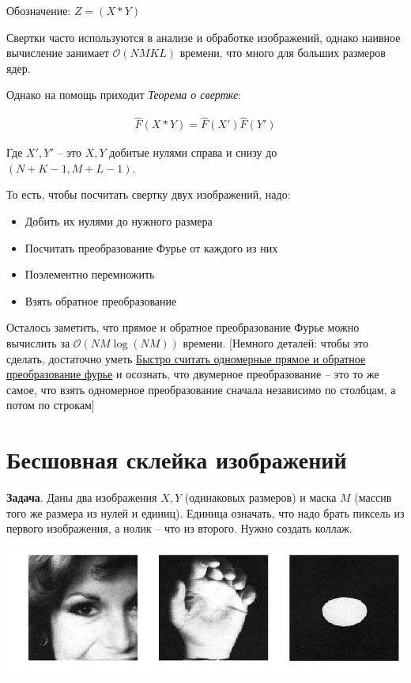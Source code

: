 \documentclass[]{book}
\theoremstyle{definition}
\begin{document}
    Обозначение: $Z = (X \ast Y)$
    
    Свертки часто используются в анализе и обработке изображений, однако наивное вычисление занимает $\mathcal{O}(NMKL)$ времени, что много для больших размеров ядер.
    
    Однако на помощь приходит \textit{Теорема о свертке}:
    
    \begin{gather*}
        \hat{F}(X \ast Y) = \hat{F}(X') \hat{F}(Y')
    \end{gather*}
    
    Где $X', Y'$ -- это $X, Y$ добитые нулями справа и снизу до $(N + K - 1, M + L - 1)$.
    
    То есть, чтобы посчитать свертку двух изображений, надо:
    \begin{itemize}
        \item Добить их нулями до нужного размера
        \item Посчитать преобразование Фурье от каждого из них
        \item Поэлементно перемножить
        \item Взять обратное преобразование
    \end{itemize}
    
    Осталось заметить, что прямое и обратное преобразование Фурье можно вычислить за $\mathcal{O}(NM \log(NM))$ времени. [Немного деталей: чтобы это сделать, достаточно уметь \href{https://ru.wikipedia.org/wiki/Быстрое_преобразование_Фурье}{Быстро считать одномерные прямое и обратное преобразование фурье} и осознать, что двумерное преобразование -- это то же самое, что взять одномерное преобразование сначала независимо по столбцам, а потом по строкам]

\section*{Бесшовная склейка изображений}

\textbf{Задача}. Даны два изображения $X, Y$ (одинаковых размеров) и маска $M$ (массив того же размера из нулей и единиц). Единица означать, что надо брать пиксель из первого изображения, а нолик -- что из второго. Нужно создать коллаж.

\begin{center}
    \includegraphics[scale=0.4]{images/task.png}
\end{center}
\end{document}
